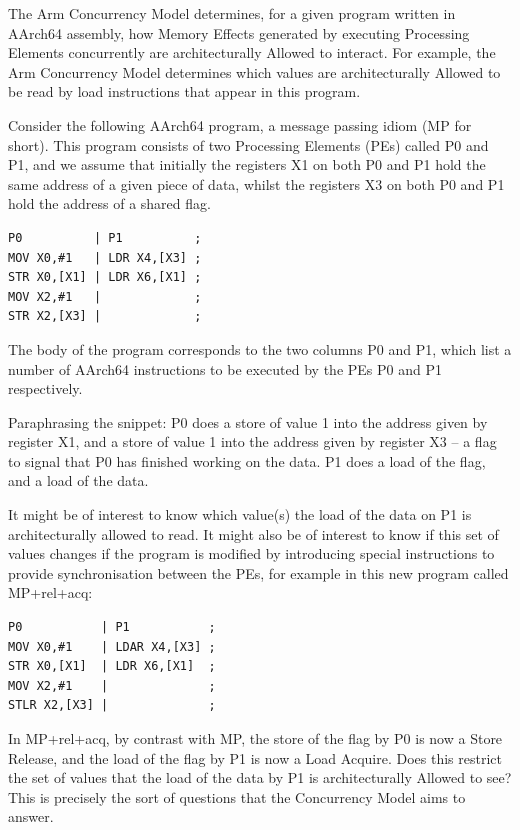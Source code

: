 \documentclass{book}
\begin{document}
The Arm Concurrency Model determines, for a given program written in AArch64
assembly, how Memory Effects generated by executing Processing Elements
concurrently are architecturally Allowed to interact. For example, the Arm
Concurrency Model determines which values are architecturally Allowed to be
read by load instructions that appear in this program. 

Consider the following AArch64 program, a message passing idiom (MP for short). This program consists of two Processing Elements (PEs) called P0 and P1, and we assume that initially the registers X1 on both P0 and P1 hold the same address of a given piece of data, whilst the registers X3 on both P0 and P1 hold the address of a shared flag.

\begin{verbatim}
P0          | P1          ; 
MOV X0,#1   | LDR X4,[X3] ; 
STR X0,[X1] | LDR X6,[X1] ; 
MOV X2,#1   |             ; 
STR X2,[X3] |             ; 
\end{verbatim}

The body of the program corresponds to the two columns P0 and P1, which list a number of AArch64 instructions to be executed by the PEs P0 and P1 respectively.  
 
Paraphrasing the snippet: P0 does a store of value 1 into the address given by register X1, and a store of value 1 into the address given by register X3 – a flag to signal that P0 has finished working on the data. P1 does a load of the flag, and a load of the data. 
 
It might be of interest to know which value(s) the load of the data on P1 is architecturally allowed to read.  
%
It might also be of interest to know if this set of values changes if the program is modified by introducing special instructions to provide synchronisation between the PEs, for example in this new program called MP+rel+acq: 

\begin{verbatim}
P0           | P1           ; 
MOV X0,#1    | LDAR X4,[X3] ; 
STR X0,[X1]  | LDR X6,[X1]  ; 
MOV X2,#1    |              ; 
STLR X2,[X3] |              ; 
\end{verbatim}

In MP+rel+acq, by contrast with MP, the store of the flag by P0 is now a Store Release, and the load of the flag by P1 is now a Load Acquire. Does this restrict the set of values that the load of the data by P1 is architecturally Allowed to see? 
%
This is precisely the sort of questions that the Concurrency Model aims to answer. 
\end{document}
